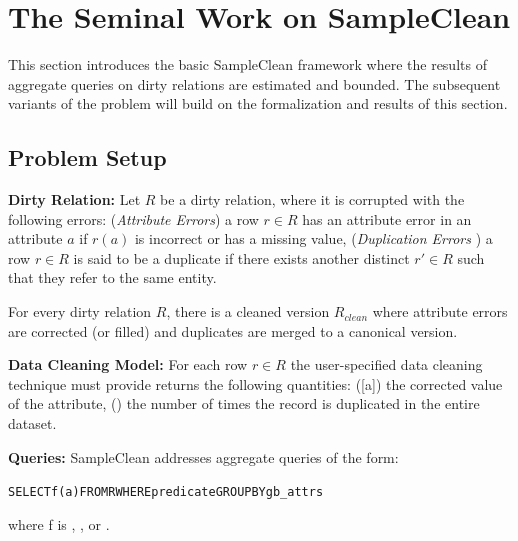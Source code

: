\section{The Seminal Work on SampleClean \cite{wang1999sample}}



This section introduces the basic SampleClean framework where the results of aggregate queries on dirty relations are estimated and bounded. The subsequent variants of the problem will build on the formalization and results of this section.

\subsection{Problem Setup}

\noindent \textbf{Dirty Relation: } Let $R$ be a dirty relation, where it is corrupted with the following errors: (\emph{Attribute Errors}) a row $r\in R$ has an attribute error in an attribute $a$ if $r(a)$ is incorrect or has a missing value,  (\emph{Duplication Errors} ) a row $r \in R$ is said to be a duplicate if there exists another distinct $r' \in R$ such that they refer to the same entity.

\vspace{.25em}

\noindent For every dirty relation $R$, there is a cleaned version $R_{clean}$ where attribute errors are corrected (or filled) and duplicates are merged to a canonical version. 

\vspace{.25em}

\noindent\textbf{Data Cleaning Model: } 
For each row $r \in R$ the user-specified data cleaning technique must provide returns the following quantities: ([a]) the corrected value of the attribute, () the number of times the record is duplicated in the entire dataset.

\vspace{.25em}

\noindent\textbf{Queries: } SampleClean addresses aggregate queries of the form:
\begin{alltt}
SELECT \textsf{f}(a) FROM R WHERE predicate GROUP BY gb_attrs
\end{alltt}
where f is \avgfunc, \sumfunc, or \countfunc. 

